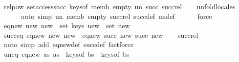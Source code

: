 \begin{isabellebody}
\isanewline
\isanewline
{}\isamarkupfalse%
\ relpow{\isacharprime}{\kern0pt}{\isacharcolon}{\kern0pt}\ set{\isacharunderscore}{\kern0pt}access{\isacharunderscore}{\kern0pt}succ\ keys{\isacharunderscore}{\kern0pt}of\ memb\ empty\ un{\isacharprime}{\kern0pt}\ succ{\isacharprime}{\kern0pt}\ succ{\isacharunderscore}{\kern0pt}rel\isanewline
%
\isadelimproof
\ \ %
\endisadelimproof
%
\isatagproof
{}\isamarkupfalse%
\ {\isacharparenleft}{\kern0pt}unfold{\isacharunderscore}{\kern0pt}locales{\isacharcomma}{\kern0pt}\isanewline
\ \ \ \ \ \ auto\ simp{\isacharcolon}{\kern0pt}\ un\ memb\ empty\ succ{\isacharunderscore}{\kern0pt}rel\ succ{\isacharprime}{\kern0pt}{\isacharunderscore}{\kern0pt}def\ un{\isacharprime}{\kern0pt}{\isacharunderscore}{\kern0pt}def{\isacharcomma}{\kern0pt}\isanewline
\ \ \ \ \ \ force{\isacharparenright}{\kern0pt}%
\endisatagproof
{\isafoldproof}%
%
\isadelimproof
\isanewline
%
\endisadelimproof
\isanewline
{}\isamarkupfalse%
\ {\isachardoublequoteopen}eq{\isacharunderscore}{\kern0pt}new\ new\ new{\isacharprime}{\kern0pt}\ {\isasymequiv}\ set\ {\isacharparenleft}{\kern0pt}keys\ new{\isacharparenright}{\kern0pt}\ {\isacharequal}{\kern0pt}\ set\ new{\isacharprime}{\kern0pt}{\isachardoublequoteclose}\ \isanewline
\isanewline
{}\isamarkupfalse%
\ succ{\isacharunderscore}{\kern0pt}eq{\isacharcolon}{\kern0pt}\ {\isachardoublequoteopen}eq{\isacharunderscore}{\kern0pt}new\ new\ new{\isacharprime}{\kern0pt}\ {\isasymLongrightarrow}\ eq{\isacharunderscore}{\kern0pt}new\ {\isacharparenleft}{\kern0pt}succ\ new{\isacharparenright}{\kern0pt}\ {\isacharparenleft}{\kern0pt}succ{\isacharprime}{\kern0pt}\ new{\isacharprime}{\kern0pt}{\isacharparenright}{\kern0pt}{\isachardoublequoteclose}\isanewline
%
\isadelimproof
\ \ %
\endisadelimproof
%
\isatagproof
{}\isamarkupfalse%
\ succ{\isacharunderscore}{\kern0pt}rel\ \isamarkupfalse%
\ {\isacharparenleft}{\kern0pt}auto\ simp\ add{\isacharcolon}{\kern0pt}\ eq{\isacharunderscore}{\kern0pt}new{\isacharunderscore}{\kern0pt}def\ succ{\isacharprime}{\kern0pt}{\isacharunderscore}{\kern0pt}def{\isacharparenright}{\kern0pt}\ fastforce%
\endisatagproof
{\isafoldproof}%
%
\isadelimproof
\isanewline
%
\endisadelimproof
\isanewline
{}\isamarkupfalse%
\ un{\isacharunderscore}{\kern0pt}eq{\isacharcolon}{\kern0pt}\ {\isachardoublequoteopen}eq{\isacharunderscore}{\kern0pt}new\ as\ as{\isacharprime}{\kern0pt}\ {\isasymLongrightarrow}\ keys{\isacharunderscore}{\kern0pt}of\ bs\ {\isacharequal}{\kern0pt}\ keys{\isacharunderscore}{\kern0pt}of\ bs{\isacharprime}{\kern0pt}\isanewline

\end{isabellebody}
